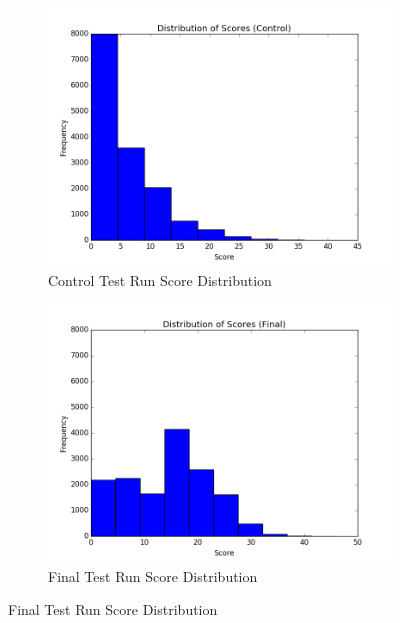 \documentclass[12pt]{article}
\begin{document}
\begin{figure}[ht]
\begin{subfigure}{0.5\textwidth}
\centering
\includegraphics[width=1\textwidth]{Figures/control_hist}
\caption{Control Test Run Score Distribution}
\label{fig:control_hist}
\end{subfigure}%
\begin{subfigure}{0.5\textwidth}
\centering
\includegraphics[width=1\textwidth]{Figures/final_hist}
\caption{Final Test Run Score Distribution}
\label{fig:final_hist}
\end{subfigure}


\end{figure}
\end{document}
